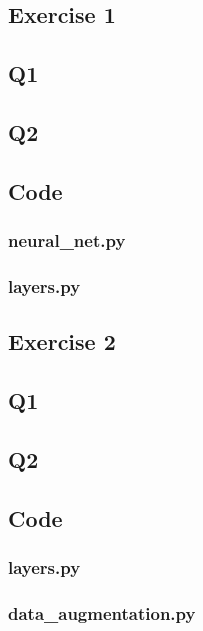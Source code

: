 \begin{appendices}
\chapter{Exercise 1}
\section{Q1}

\section{Q2}

\section{Code}
\subsection{neural\_net.py}

\subsection{layers.py}

\end{appendices}

\begin{appendices}
\chapter{Exercise 2}
\section{Q1}

\section{Q2}

\section{Code}
\subsection{layers.py}

\subsection{data\_augmentation.py}

\end{appendices}